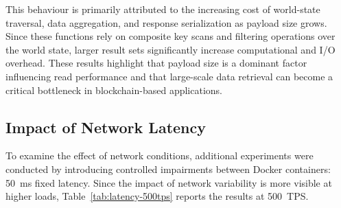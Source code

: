 \documentclass[manuscript,screen,nofonts]{acmart}
\begin{document}
This behaviour is primarily attributed to the increasing cost of world-state traversal, data aggregation, and response serialization as payload size grows. Since these functions rely on composite key scans and filtering operations over the world state, larger result sets significantly increase computational and I/O overhead. These results highlight that payload size is a dominant factor influencing read performance and that large-scale data retrieval can become a critical bottleneck in blockchain-based applications.

\begin{table}[h]
	\centering
	\caption{Performance Results for Retrieval Functions at 100 TPS under Varying Payload Sizes}
	\label{tab:retrieval-combined}
\end{table}
\subsection{Impact of Network Latency}

To examine the effect of network conditions, additional experiments were conducted by introducing controlled impairments between Docker containers: 50~ms fixed latency. Since the impact of network variability is more visible at higher loads, Table~\ref{tab:latency-500tps} reports the results at 500~TPS.
\end{document}
